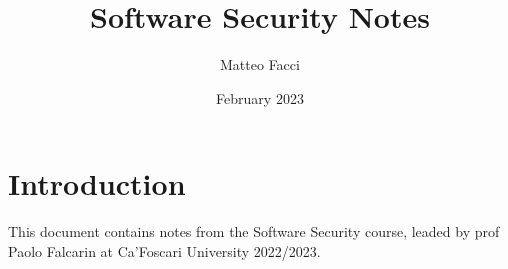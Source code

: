 \documentclass{article}
\title{Software Security Notes}
\author{Matteo Facci}
\date{February 2023}
\begin{document}
\maketitle
\newpage
\section{Introduction}
This document contains notes from the Software Security course, leaded by prof Paolo Falcarin at Ca'Foscari University 2022/2023.















\end{document}
